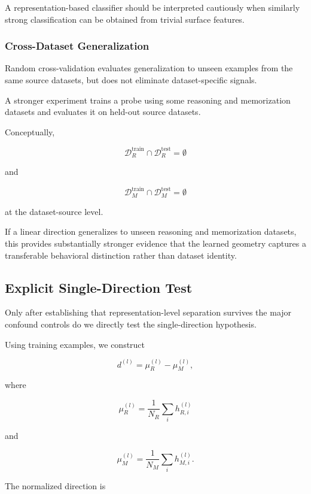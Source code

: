 \documentclass[11pt]{article}
\begin{document}
A representation-based classifier should be interpreted cautiously
when similarly strong classification can be obtained from trivial
surface features.


\subsubsection{Cross-Dataset Generalization}

Random cross-validation evaluates generalization to unseen examples
from the same source datasets, but does not eliminate dataset-specific
signals.

A stronger experiment trains a probe using some reasoning and
memorization datasets and evaluates it on held-out source datasets.

Conceptually,

\[
\mathcal{D}^{\mathrm{train}}_R
\cap
\mathcal{D}^{\mathrm{test}}_R
=
\emptyset
\]

and

\[
\mathcal{D}^{\mathrm{train}}_M
\cap
\mathcal{D}^{\mathrm{test}}_M
=
\emptyset
\]

at the dataset-source level.

If a linear direction generalizes to unseen reasoning and memorization
datasets, this provides substantially stronger evidence that the
learned geometry captures a transferable behavioral distinction rather
than dataset identity.


\subsection{Explicit Single-Direction Test}

Only after establishing that representation-level separation survives
the major confound controls do we directly test the
single-direction hypothesis.

Using training examples, we construct

\[
d^{(l)}
=
\mu_R^{(l)}
-
\mu_M^{(l)},
\]

where

\[
\mu_R^{(l)}
=
\frac{1}{N_R}
\sum_i h_{R,i}^{(l)}
\]

and

\[
\mu_M^{(l)}
=
\frac{1}{N_M}
\sum_i h_{M,i}^{(l)}.
\]

The normalized direction is
\end{document}
